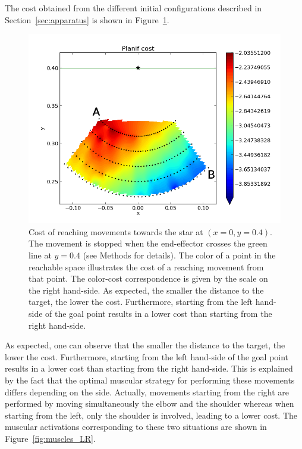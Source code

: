 \documentclass[10pt]{article}
\begin{document}
The cost obtained from the different initial configurations described in Section~\ref{sec:apparatus} is shown in Figure~\ref{fig:cost_nops}. 

\begin{figure}[htp]
  \centering
\includegraphics[width=.99\columnwidth]{images/cost_nops}
  \caption{Cost of reaching movements towards the star at $(x=0,y=0.4)$. The movement is stopped when the end-effector crosses the green line at $y=0.4$ (see Methods for details). The color of a point in the reachable space illustrates the cost of a reaching movement from that point. The color-cost correspondence is given by the scale on the right hand-side. As expected, the smaller the distance to the target, the lower the cost. Furthermore, starting from the left hand-side of the goal point results in a lower cost than starting from the right hand-side.
\label{fig:cost_nops}}
\end{figure}

As expected, one can observe that the smaller the distance to the target, the lower the cost. Furthermore, starting from the left hand-side of the goal point results in a lower cost than starting from the right hand-side. This is explained by the fact that the optimal muscular strategy for performing these movements differs depending on the side. Actually, movements starting from the right are performed by moving simultaneously the elbow and the shoulder whereas when starting from the left, only the shoulder is involved, leading to a lower cost.
The muscular activations corresponding to these two situations are shown in Figure~\ref{fig:muscles_LR}. 
\end{document}
